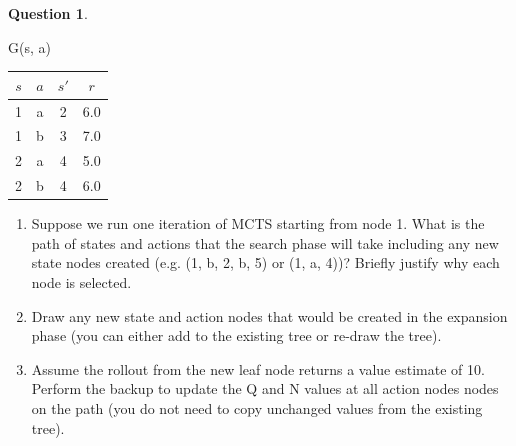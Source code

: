 \documentclass{article}
\theoremstyle{definition}
\newtheorem{question}[thm]{Question}
\begin{document}
\begin{question}
\begin{minipage}{0.5\textwidth}
    \end{minipage}
    \begin{minipage}{0.5\textwidth}
        \begin{center}
            G(s, a)\\
            \begin{tabular}{cc|cc}
                \toprule
                $s$ & $a$ & $s'$ & $r$ \\
                \midrule
                1 & a & 2 & 6.0 \\
                1 & b & 3 & 7.0 \\
                2 & a & 4 & 5.0 \\
                2 & b & 4 & 6.0 \\
                \bottomrule
            \end{tabular}
        \end{center}
    \end{minipage}
    \vspace{3cm}
    \begin{enumerate}[label=(\alph*)]
        \item Suppose we run one iteration of MCTS starting from node 1. What is the path of states and actions that the search phase will take including any new state nodes created (e.g. (1, b, 2, b, 5) or (1, a, 4))? Briefly justify why each node is selected.
        \item Draw any new state and action nodes that would be created in the expansion phase (you can either add to the existing tree or re-draw the tree).
        \item Assume the rollout from the new leaf node returns a value estimate of 10. Perform the backup to update the Q and N values at all action nodes nodes on the path (you do not need to copy unchanged values from the existing tree).
    \end{enumerate}
\end{question}
\end{document}
